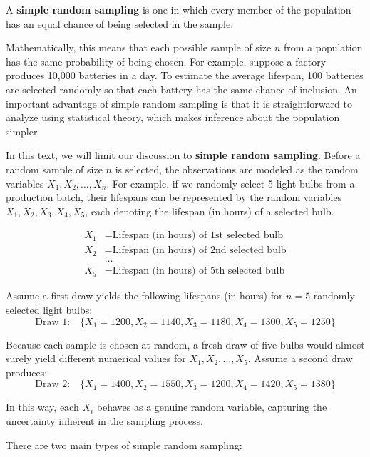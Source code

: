 \documentclass[twoside]{book}
\begin{document}
\begin{textbox}
A \textbf{simple random sampling} is one in which every member of the population has an equal chance of being selected in the sample.
\end{textbox}
 Mathematically, this means that each possible sample of size $n$ from a population has the same probability of being chosen. For example, suppose a factory produces 10,000 batteries in a day. To estimate the average lifespan, 100 batteries are selected randomly so that each battery has the same chance of inclusion. An important advantage of simple random sampling is that it is straightforward to analyze using statistical theory, which makes inference about the population simpler

In this text, we will limit our discussion to \textbf{simple random sampling}.  Before a random sample of size $n$ is selected, the observations are modeled as the random variables $X_1 , X_2, \dots , X_n$. For example, if we randomly select 5 light bulbs from a production batch, their lifespans can be represented by the random variables \( X_1, X_2, X_3, X_4, X_5 \), each denoting the lifespan (in hours) of a selected bulb.

\begin{align*}
    X_1 &= \text{Lifespan (in hours) of 1st selected bulb} \\
    X_2 &= \text{Lifespan (in hours) of 2nd selected bulb} \\
    &\dots \\
    X_5 &= \text{Lifespan (in hours) of 5th selected bulb}
\end{align*}


Assume a first draw yields the following lifespans (in hours) for \(n = 5\) randomly selected light bulbs:
\[
\text{Draw 1:} \quad \{X_1=1200, X_2=1140, X_3=1180, X_4=1300, X_5=1250\}
\]

Because each sample is chosen at random, a fresh draw of five bulbs would almost surely yield different numerical values for \(X_1, X_2, \dots, X_5\). Assume a second draw produces:
\[
\text{Draw 2:} \quad \{X_1=1400, X_2=1550, X_3=1200, X_4=1420, X_5=1380\}
\]

In this way, each \(X_i\) behaves as a genuine random variable, capturing the uncertainty inherent in the sampling process.

There are two main types of simple random sampling:
\end{document}
